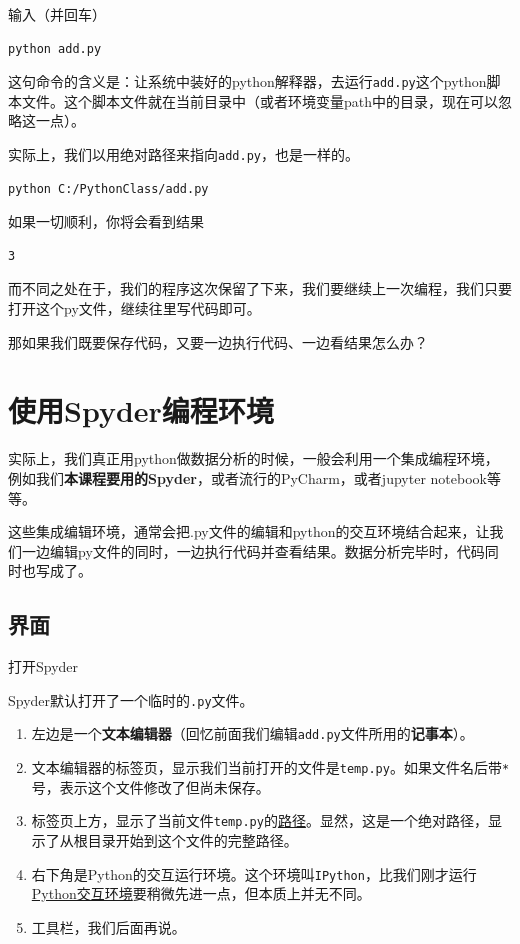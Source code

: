 \documentclass[
]{book}
\providecommand{\tightlist}{%
  \setlength{\itemsep}{0pt}\setlength{\parskip}{0pt}}
\begin{document}
输入（并回车）

\begin{verbatim}
python add.py
\end{verbatim}

这句命令的含义是：让系统中装好的python解释器，去运行\texttt{add.py}这个python脚本文件。这个脚本文件就在当前目录中（或者环境变量path中的目录，现在可以忽略这一点）。

实际上，我们以用绝对路径来指向\texttt{add.py}，也是一样的。

\begin{verbatim}
python C:/PythonClass/add.py
\end{verbatim}

如果一切顺利，你将会看到结果

\begin{verbatim}
3
\end{verbatim}

而不同之处在于，我们的程序这次保留了下来，我们要继续上一次编程，我们只要打开这个py文件，继续往里写代码即可。

那如果我们既要保存代码，又要一边执行代码、一边看结果怎么办？

\hypertarget{ux4f7fux7528spyderux7f16ux7a0bux73afux5883}{%
\chapter{使用Spyder编程环境}\label{ux4f7fux7528spyderux7f16ux7a0bux73afux5883}}

实际上，我们真正用python做数据分析的时候，一般会利用一个集成编程环境，例如我们\textbf{本课程要用的Spyder}，或者流行的PyCharm，或者jupyter notebook等等。

这些集成编辑环境，通常会把.py文件的编辑和python的交互环境结合起来，让我们一边编辑py文件的同时，一边执行代码并查看结果。数据分析完毕时，代码同时也写成了。

\hypertarget{ux754cux9762}{%
\section{界面}\label{ux754cux9762}}

打开Spyder

Spyder默认打开了一个临时的\texttt{.py}文件。

\begin{enumerate}
\def\labelenumi{\arabic{enumi}.}
\tightlist
\item
  左边是一个\textbf{文本编辑器}（回忆前面我们编辑\texttt{add.py}文件所用的\textbf{记事本}）。
\item
  文本编辑器的标签页，显示我们当前打开的文件是\texttt{temp.py}。如果文件名后带\texttt{*}号，表示这个文件修改了但尚未保存。
\item
  标签页上方，显示了当前文件\texttt{temp.py}的\protect\hyperlink{path}{路径}。显然，这是一个绝对路径，显示了从根目录开始到这个文件的完整路径。
\item
  右下角是Python的交互运行环境。这个环境叫\texttt{IPython}，比我们刚才运行\protect\hyperlink{python_interactive}{Python交互环境}要稍微先进一点，但本质上并无不同。
\item
  工具栏，我们后面再说。
\end{enumerate}
\end{document}
